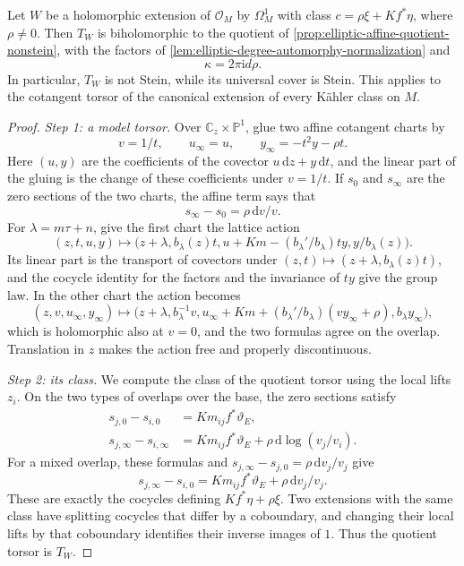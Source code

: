 \begin{theorem}\label{thm:split-elliptic-cotangent-torsor}
Let $W$ be a holomorphic extension of $\mathcal O_M$ by $\Omega_M^1$ with class $c=\rho\xi+Kf^*\eta$, where $\rho\ne0$. Then $T_W$ is biholomorphic to the quotient of \cref{prop:elliptic-affine-quotient-nonstein}, with the factors of \cref{lem:elliptic-degree-automorphy-normalization} and
\[
 \kappa=2\pi\mathrm{i}d\rho.
\]
In particular, $T_W$ is not Stein, while its universal cover is Stein. This applies to the cotangent torsor of the canonical extension of every K\"ahler class on $M$.
\end{theorem}
\begin{proof}
\emph{Step 1: a model torsor.} Over $\mathbb C_z\times\mathbb P^1$, glue two affine cotangent charts by
\[
 v=1/t,\qquad u_\infty=u,\qquad
 y_\infty=-t^2y-\rho t.
\]
Here $(u,y)$ are the coefficients of the covector $u\,\mathrm{d}z+y\,\mathrm{d}t$, and the linear part of the gluing is the change of these coefficients under $v=1/t$. If $s_0$ and $s_\infty$ are the zero sections of the two charts, the affine term says that
\[
 s_\infty-s_0=\rho\,\mathrm{d}v/v.
\]
For $\lambda=m\tau+n$, give the first chart the lattice action
\[
 (z,t,u,y)\longmapsto
 \bigl(z+\lambda,b_\lambda(z)t,
 u+Km-(b_\lambda'/b_\lambda)ty,y/b_\lambda(z)\bigr).
\]
Its linear part is the transport of covectors under $(z,t)\mapsto(z+\lambda,b_\lambda(z)t)$, and the cocycle identity for the factors and the invariance of $ty$ give the group law. In the other chart the action becomes
\[
 (z,v,u_\infty,y_\infty)\longmapsto
 \bigl(z+\lambda,b_\lambda^{-1}v,
 u_\infty+Km+(b_\lambda'/b_\lambda)(v y_\infty+\rho),
 b_\lambda y_\infty\bigr),
\]
which is holomorphic also at $v=0$, and the two formulas agree on the overlap. Translation in $z$ makes the action free and properly discontinuous.

\emph{Step 2: its class.} We compute the class of the quotient torsor using the local lifts $z_i$. On the two types of overlaps over the base, the zero sections satisfy
\[
 \begin{aligned}
 s_{j,0}-s_{i,0}&=Km_{ij}f^*\vartheta_E,\\
 s_{j,\infty}-s_{i,\infty}
   &=Km_{ij}f^*\vartheta_E+\rho\,\mathrm{d}\log(v_j/v_i).
 \end{aligned}
\]
For a mixed overlap, these formulas and $s_{j,\infty}-s_{j,0}=\rho\,\mathrm{d}v_j/v_j$ give
\[
 s_{j,\infty}-s_{i,0}=Km_{ij}f^*\vartheta_E+\rho\,\mathrm{d}v_j/v_j.
\]
These are exactly the cocycles defining $Kf^*\eta+\rho\xi$. Two extensions with the same class have splitting cocycles that differ by a coboundary, and changing their local lifts by that coboundary identifies their inverse images of $1$. Thus the quotient torsor is $T_W$.


\end{proof}

